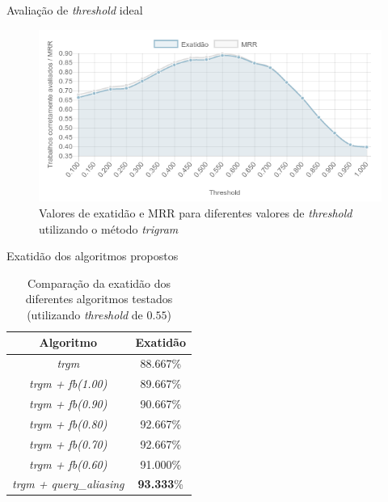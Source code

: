 \documentclass{beamer}
\begin{document}
\begin{frame}{Avaliação de \textit{threshold} ideal}
  \begin{figure}
    \includegraphics[width=\textwidth]{figuras/avaliacao-threshold.png}
    \caption{Valores de exatidão e MRR para diferentes valores de \textit{threshold} utilizando o método \textit{trigram}}
  \end{figure}
\end{frame}

\begin{frame}{Exatidão dos algoritmos propostos}
  \begin{table}
    \begin{tabular}{ c | c }
      \textbf{Algoritmo} & \textbf{Exatidão} \\
      \hline \hline
      \textit{trgm} & 88.667\% \\
      \textit{trgm + fb(1.00)} & 89.667\% \\
      \textit{trgm + fb(0.90)} & 90.667\% \\
      \textit{trgm + fb(0.80)} & 92.667\% \\
      \textit{trgm + fb(0.70)} & 92.667\% \\
      \textit{trgm + fb(0.60)} & 91.000\% \\
      \textit{trgm + query\_aliasing} & \textbf{93.333}\%
    \end{tabular}
    \caption{Comparação da exatidão dos diferentes algoritmos testados (utilizando \textit{threshold} de $0.55$)}
  \end{table}
\end{frame}
\end{document}
